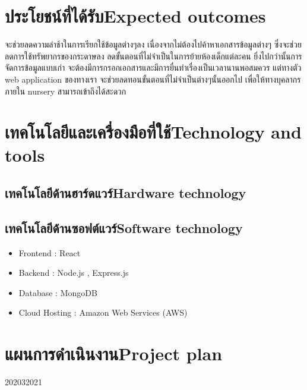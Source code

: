 \section{\ifcpe ประโยชน์ที่ได้รับ\else Expected outcomes\fi}
จะช่วยลดความล่าช้าในการเรียกใช้ข้อมูลต่างๆลง    
  เนื่องจากไม่ต้องไปค้าหาเอกสารข้อมูลต่างๆ ซึ่งจะช่วยลดการใช้ทรัพยากรของกระดาษลง  ลดขั้นตอนที่ไม่จำเป็นในการย้ายห้องเด็กแต่ละคน ยิ่งไปกว่านั้นการจัดการข้อมูลแบบเก่า  จะต้องมีการกรอกเอกสารและมีการยื่นทำเรื่องเป็นเวลานานพอสมควร แต่ทางตัว web application ของทางเรา จะช่วยลดทอนขั้นตอนที่ไม่จำเป็นต่างๆนั้นออกไป เพื่อให้ทางบุคลากรภายใน nursery สามารถเข้าถึงได้สะดวก

\section{\ifcpe เทคโนโลยีและเครื่องมือที่ใช้\else Technology and tools\fi}

\subsection{\ifcpe เทคโนโลยีด้านฮาร์ดแวร์\else Hardware technology\fi}


\subsection{\ifcpe เทคโนโลยีด้านซอฟต์แวร์\else Software technology\fi}
\begin{itemize}
    \item Frontend : React 	
    \item Backend : Node.js , Express.js 
    \item Database : MongoDB
    \item Cloud Hosting : Amazon Web Services (AWS)
\end{itemize}



\section{\ifcpe แผนการดำเนินงาน\else Project plan\fi}

\begin{plan}{7}{2020}{3}{2021}




\end{plan}


